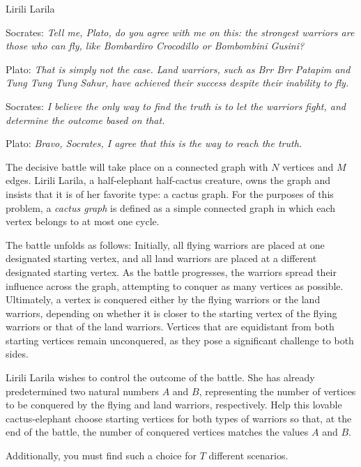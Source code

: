 \begin{statement}[
  problempoints=100,
  timelimit=2 seconds,
  memorylimit=512 MiB,
]{Lirili Larila}

Socrates:  
\textit{Tell me, Plato, do you agree with me on this:  
the strongest warriors are those who can fly, like Bombardiro Crocodillo or Bombombini Gusini?}

Plato:  
\textit{That is simply not the case. Land warriors, such as Brr Brr Patapim and Tung Tung Tung Sahur, 
have achieved their success despite their inability to fly.}

Socrates:  
\textit{I believe the only way to find the truth is to let the warriors fight, and  
determine the outcome based on that.}

Plato:  
\textit{Bravo, Socrates, I agree that this is the way to reach the truth.}

The decisive battle will take place on a connected graph with $N$ vertices and $M$ edges.  
Lirili Larila, a half-elephant half-cactus creature, owns the graph and insists that it is of her favorite type: a cactus graph.  
For the purposes of this problem, a \textit{cactus graph} is defined as a simple connected graph 
in which each vertex belongs to at most one cycle.

The battle unfolds as follows:  
Initially, all flying warriors are placed at one designated starting vertex, 
and all land warriors are placed at a different designated starting vertex.  
As the battle progresses, the warriors spread their influence across the graph, attempting to conquer as many vertices as possible.  
Ultimately, a vertex is conquered either by the flying warriors or the land warriors, depending on  
whether it is closer to the starting vertex of the flying warriors or that of the land warriors.  
Vertices that are equidistant from both starting vertices  
remain unconquered, as they pose a significant challenge to both sides.

Lirili Larila wishes to control the outcome of the battle.  
She has already predetermined two natural numbers $A$ and $B$, 
representing the number of vertices to be conquered by the flying and land warriors, respectively.  
Help this lovable cactus-elephant choose starting vertices for both types of warriors 
so that, at the end of the battle, the number of conquered vertices matches the values $A$ and $B$.

Additionally, you must find such a choice for $T$ different scenarios.


\end{statement}
